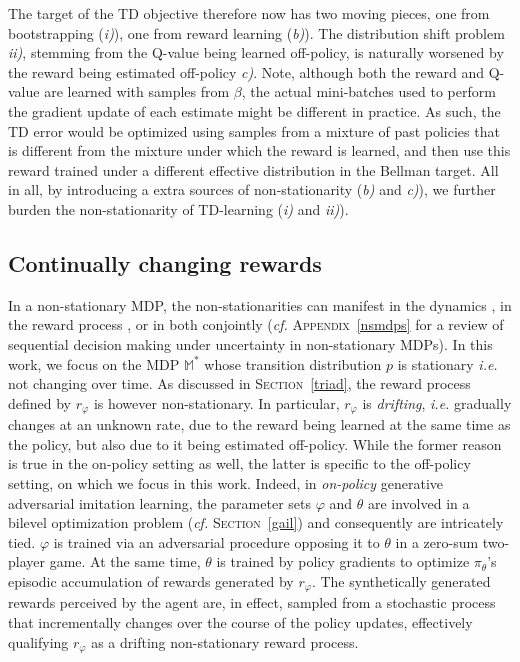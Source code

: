 The target of the TD objective therefore now has two moving pieces,
one from bootstrapping (\textit{i)}),
one from reward learning (\textit{b)}).
The distribution shift problem \textit{ii)}, stemming from the Q-value being learned off-policy,
is naturally worsened by the reward being estimated off-policy \textit{c)}.
Note, although both the reward and Q-value are learned with
samples from $\beta$, the actual mini-batches used to perform the gradient update of each estimate
might be different in practice.
As such, the TD error would be optimized using samples from a mixture of past policies that
is different from the mixture under which the reward is learned,
and then use this reward trained under a different effective distribution in the Bellman target.
All in all, by introducing a extra sources of non-stationarity (\textit{b)} and \textit{c)}),
we further burden the non-stationarity of TD-learning (\textit{i)} and \textit{ii)}).

\subsection{Continually changing rewards}
\label{nonstat}

In a non-stationary MDP,
the non-stationarities can manifest in the dynamics
\cite{Nilim2005-rq,Da_Silva2006-gj,Xu2007-iq,Lim2013-ml,Abdallah2016-pd},
in the reward process
\cite{Even-dar2005-rg,Dick2014-br},
or in both conjointly \cite{Yu2009-xp,Yu2009-yo,Abbasi-Yadkori2013-vd,Gajane2018-ee,
Padakandla2019-mb,Yu2019-sc,Lecarpentier2019-av}
(\textit{cf.} \textsc{Appendix}~\ref{nsmdps} for a review of
sequential decision making under uncertainty in non-stationary MDPs).
In this work, we focus on the MDP $\mathbb{M}^*$
whose transition distribution $p$ is stationary \textit{i.e.} not changing over time.
As discussed in \textsc{Section}~\ref{triad}, the reward process defined by $r_\varphi$ is
however non-stationary.
In particular, $r_\varphi$ is \emph{drifting},
\textit{i.e.} gradually changes at an unknown rate,
due to the reward being learned at the same time as the policy,
but also due to it being estimated off-policy.
While the former reason is true in the on-policy setting as well,
the latter is specific to the off-policy setting, on which we focus in this work.
Indeed, in \emph{on-policy} generative adversarial imitation learning,
the parameter sets $\varphi$ and $\theta$ are involved in a bilevel optimization
problem (\textit{cf.} \textsc{Section}~\ref{gail}) and consequently are intricately tied.
$\varphi$ is trained via an adversarial procedure opposing it to $\theta$ in
a zero-sum two-player game.
At the same time, $\theta$ is trained by policy gradients to optimize $\pi_\theta$'s
episodic accumulation of rewards generated by $r_\varphi$.
The synthetically generated rewards perceived by the agent
are, in effect, sampled from a stochastic process
that incrementally changes over the course of the policy updates,
effectively qualifying $r_\varphi$ as a drifting non-stationary reward process.


